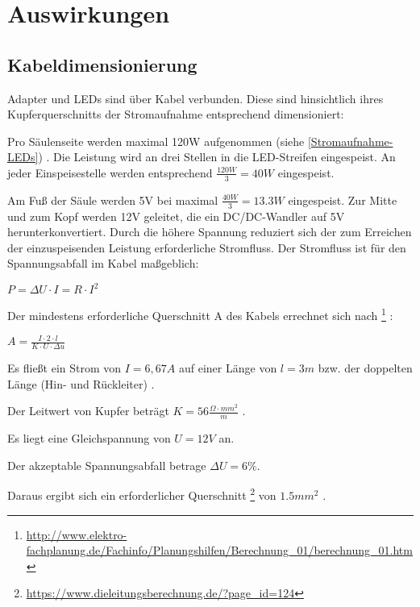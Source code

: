 
\section{Auswirkungen}

\subsection{Kabeldimensionierung}
Adapter und LEDs sind über Kabel verbunden.
Diese sind
hinsichtlich ihres Kupferquerschnitts
der Stromaufnahme entsprechend
dimensioniert:

Pro S\"aulenseite werden maximal 120W aufgenommen
(siehe \ref{Stromaufnahme-LEDs})
.
Die Leistung wird an drei Stellen in die LED-Streifen eingespeist.
An jeder Einspeisestelle
werden entsprechend
$
\frac{120W}{3} = 40W
$
eingespeist.

Am Fu{\ss} der S\"aule werden 5V
bei maximal
$
\frac{40 W}{3} = 13.3 W
$
eingespeist.
Zur Mitte und zum Kopf werden 12V geleitet,
die ein DC/DC-Wandler
auf 5V
herunterkonvertiert.
Durch die h\"ohere Spannung reduziert sich
der zum Erreichen der einzuspeisenden Leistung
erforderliche Stromfluss.
Der Stromfluss ist f\"ur den
Spannungsabfall
im Kabel
ma{\ss}geblich:
\begin{center}
$
P = {\Delta}U \cdot I = R \cdot I^2
$
\end{center}

Der mindestens erforderliche
Querschnitt A des Kabels
errechnet sich nach
\footnote{
	\url{http://www.elektro-fachplanung.de/Fachinfo/Planungshilfen/Berechnung\_01/berechnung\_01.htm}
}
:

\begin{center}
	$
	A = \frac{I \cdot 2 \cdot l}{K \cdot U \cdot {\Delta}u}
	$
\end{center}

Es flie{\ss}t ein Strom von
$
I = 6,67 A
$
auf einer L\"ange von
$
l = 3m
$
bzw.
der doppelten L\"ange (Hin- und R\"uckleiter)
.

Der Leitwert von Kupfer betr\"agt
$
K = 56 \frac{\Omega \cdot mm^2}m
$
.

Es liegt eine Gleichspannung von
$
U = 12V
$
an.

Der akzeptable Spannungsabfall betrage ${\Delta}U = 6\%$.

Daraus ergibt sich ein erforderlicher Querschnitt
\footnote{
\url{https://www.dieleitungsberechnung.de/?page\_id=124}
}
von
$
1.5mm^2
$
.